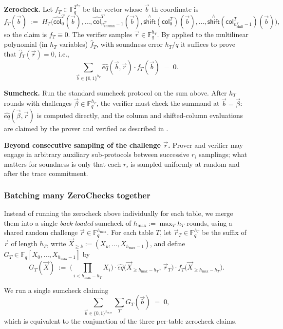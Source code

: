 \documentclass{article}
\theoremstyle{definition}
\newcommand{\Fq}{\mathbb F_q}
\begin{document}
\textbf{Zerocheck.} Let $f_T \in \Fq^{2^{h_T}}$ be the vector whose $\vec b$-th coordinate is
\[
f_T(\vec b) \;:=\; H_T\big(\hat{\textsf{col}}^T_0(\vec b), \ldots, \hat{\textsf{col}}^T_{n_\text{column}^T-1}(\vec b), \overset{\scriptscriptstyle\wedge}{\textsf{shift}}(\textsf{col}^T_0)(\vec b), \ldots, \overset{\scriptscriptstyle\wedge}{\textsf{shift}}(\textsf{col}^T_{n_\text{shift}^T-1})(\vec b)\big),
\]
so the claim is $f_T \equiv 0$. The verifier samples $\vec r \in \Fq^{h_T}$. By  applied to the multilinear polynomial (in $h_T$ variables) $\hat{f}_T$, with soundness error $h_T / q$ it suffices to prove that $\hat{f}_T(\vec r) = 0$, i.e.,
\[
\sum_{\vec b \in \{0,1\}^{h_T}} \hat{eq}(\vec b, \vec r) \cdot f_T(\vec b) \;=\; 0.
\]

\textbf{Sumcheck.} Run the standard sumcheck protocol \cite{sumcheck} on the sum above. After $h_T$ rounds with challenges $\vec\beta \in \Fq^{h_T}$, the verifier must check the summand at $\vec b = \vec\beta$: $\hat{eq}(\vec\beta, \vec r)$ is computed directly, and the column and shifted-column evaluations are claimed by the prover and verified as described in .

\textbf{Beyond consecutive sampling of the challenge $\vec r$.} Prover and verifier may engage in arbitrary auxiliary sub-protocols between successive $r_i$ samplings; what matters for soundness is only that each $r_i$ is sampled uniformly at random and after the trace commitment.

\subsubsection{Batching many ZeroChecks together}

Instead of running the zerocheck above individually for each table, we merge them into a single \emph{back-loaded} sumcheck of $h_{\max} := \max_T h_T$ rounds, using a shared random challenge $\vec r \in \Fq^{h_{\max}}$. For each table $T$, let $\vec r_T \in \Fq^{h_T}$ be the suffix of $\vec r$ of length $h_T$, write $\vec X_{\geq k} := (X_k, \ldots, X_{h_{\max} - 1})$, and define $G_T \in \Fq[X_0, \ldots, X_{h_{\max}-1}]$ by
\[
G_T(\vec X) \;:=\; \Big(\textstyle\prod_{i < h_{\max} - h_T} X_i\Big) \cdot \hat{eq}\big(\vec X_{\geq h_{\max} - h_T},\, \vec r_T\big) \cdot f_T\big(\vec X_{\geq h_{\max} - h_T}\big).
\]

We run a single sumcheck claiming
\[
\sum_{\vec b \in \{0, 1\}^{h_{\max}}} \sum_T G_T(\vec b) \;=\; 0,
\]
which is equivalent to the conjunction of the three per-table zerocheck claims.
\end{document}
